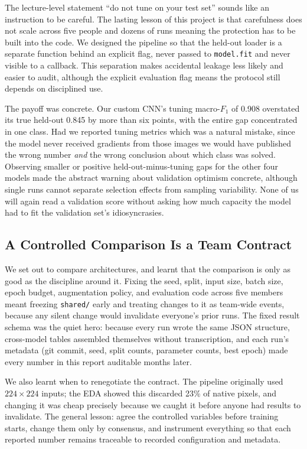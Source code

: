 \documentclass[11pt,twoside,a4paper]{article}
\begin{document}
The lecture-level statement ``do not tune on your test set'' sounds like an
instruction to be careful. The lasting lesson of this project is that
carefulness does not scale across five people and dozens of runs meaning the
protection has to be built into the code. We designed the pipeline so that
the held-out loader is a separate function behind an explicit flag, never
passed to \texttt{model.fit} and never visible to a callback. This separation
makes accidental leakage less likely and easier to audit, although the explicit
evaluation flag means the protocol still depends on disciplined use.

The payoff was concrete. Our custom CNN's tuning macro-$F_1$ of 0.908
overstated its true held-out 0.845 by more than six points, with the entire
gap concentrated in one class. Had we reported tuning metrics which was a natural
mistake, since the model never received gradients from those images we
would have published the wrong number \emph{and} the wrong conclusion about
which class was solved. Observing smaller or positive held-out-minus-tuning
gaps for the other four models made the abstract warning about validation
optimism concrete, although single runs cannot separate selection effects from
sampling variability. None of us will
again read a validation score without asking how much capacity the model had
to fit the validation set's idiosyncrasies.

\subsection{A Controlled Comparison Is a Team Contract}

We set out to compare architectures, and learnt that the comparison is only
as good as the discipline around it. Fixing the seed, split, input size,
batch size, epoch budget, augmentation policy, and evaluation code across
five members meant freezing \texttt{shared/} early and treating changes to it
as team-wide events, because any silent change would invalidate everyone's
prior runs. The fixed result schema was the quiet hero: because every run
wrote the same JSON structure, cross-model tables assembled themselves
without transcription, and each run's metadata (git commit, seed, split
counts, parameter counts, best epoch) made every number in this
report auditable months later.

We also learnt when to renegotiate the contract. The pipeline originally used
$224 \times 224$ inputs; the EDA showed this discarded 23\% of native pixels,
and changing it was cheap precisely because we caught it before anyone had
results to invalidate. The general lesson: agree the controlled variables
before training starts, change them only by consensus, and instrument
everything so that each reported number remains traceable to recorded
configuration and metadata.
\end{document}

